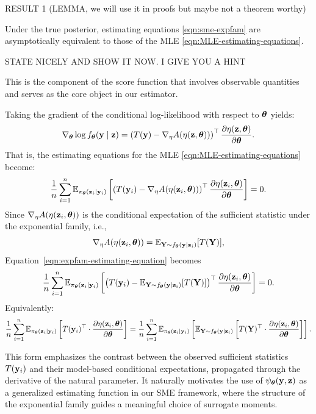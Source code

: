 \documentclass[twoside,11pt]{article}
\begin{document}
RESULT 1 (LEMMA, we will use it in proofs but maybe not a theorem worthy)

Under the true posterior, estimating equations \eqref{eqn:sme-expfam} are asymptotically equivalent to those of the MLE \eqref{eqn:MLE-estimating-equations}. 

STATE NICELY AND SHOW IT NOW. I GIVE YOU A HINT






This is the component of the score function that involves observable quantities and serves as the core object in our estimator.


Taking the gradient of the conditional log-likelihood with respect to \({\bm{\theta}}\) yields:
\[
\nabla_{\bm{\theta}} \log f_{\bm{\theta}}({\bf y} \mid {\bf z}) = \left( T({\bf y}) - \nabla_\eta A(\eta({\bf z}, {\bm{\theta}})) \right)^\top \frac{\partial \eta({\bf z}, {\bm{\theta}})}{\partial {\bm{\theta}}}.
\]
%
That is, the estimating equations for the MLE \eqref{eqn:MLE-estimating-equations} become:
%
\begin{equation}
\label{eqn:expfam-estimating-equation}
\frac{1}{n} \sum_{i=1}^n 
\mathbb{E}_{\pi_{\bm{\theta}}({\bf z}_i \mid {\bf y}_i)} 
\left[
\left( T({\bf y}_i) - \nabla_\eta A(\eta({\bf z}_i, {\bm{\theta}})) \right)^\top 
\frac{\partial \eta({\bf z}_i, {\bm{\theta}})}{\partial {\bm{\theta}}}
\right]
= 0.
\end{equation}
%
Since \( \nabla_\eta A(\eta({\bf z}_i, {\bm{\theta}})) \) is the conditional expectation of the sufficient statistic under the exponential family, i.e.,
\[
\nabla_\eta A(\eta({\bf z}_i, {\bm{\theta}})) = \mathbb{E}_{{\bf Y} \sim f_{\bm{\theta}}({\bf y} \mid {\bf z}_i)}[T({\bf Y})],
\]
Equation~\eqref{eqn:expfam-estimating-equation} becomes
\begin{equation}
\label{eqn:expfam-estimating-equation-clean}
\frac{1}{n} \sum_{i=1}^n 
\mathbb{E}_{\pi_{\bm{\theta}}({\bf z}_i \mid {\bf y}_i)} 
\left[
\left( T({\bf y}_i) - \mathbb{E}_{{\bf Y} \sim f_{\bm{\theta}}({\bf y} \mid {\bf z}_i)}[T({\bf Y})] \right)^\top 
\frac{\partial \eta({\bf z}_i, {\bm{\theta}})}{\partial {\bm{\theta}}}
\right]
= 0.
\end{equation}
%
Equivalently:
%
\begin{equation}
\label{eqn:expfam-estimating-equation-split-correct}
\frac{1}{n} \sum_{i=1}^n 
\mathbb{E}_{\pi_{\bm{\theta}}({\bf z}_i \mid {\bf y}_i)} 
\left[ 
T({\bf y}_i)^\top 
\cdot 
\frac{\partial \eta({\bf z}_i, {\bm{\theta}})}{\partial {\bm{\theta}}}
\right]
=
\frac{1}{n} \sum_{i=1}^n 
\mathbb{E}_{\pi_{\bm{\theta}}({\bf z}_i \mid {\bf y}_i)} 
\left[ 
\mathbb{E}_{{\bf Y} \sim f_{\bm{\theta}}({\bf y} \mid {\bf z}_i)}\left[T({\bf Y})^\top 
\cdot 
\frac{\partial \eta({\bf z}_i, {\bm{\theta}})}{\partial {\bm{\theta}}}\right]
\right].
\end{equation}



This form emphasizes the contrast between the observed sufficient statistics \( T({\bf y}_i) \) and their model-based conditional expectations, propagated through the derivative of the natural parameter. It naturally motivates the use of \( \psi_{\bm{\theta}}({\bf y}, {\bf z}) \) as a generalized estimating function in our SME framework, where the structure of the exponential family guides a meaningful choice of surrogate moments.
\end{document}
